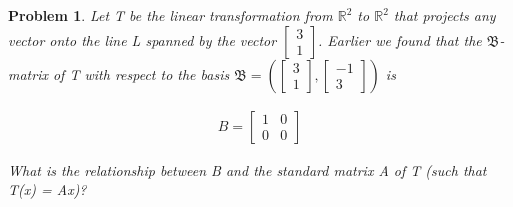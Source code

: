 \documentclass{article}
\newtheorem{problem}{Problem}
\begin{document}
\begin{problem}
Let T be the linear transformation from $\mathbb{R}^2$ to $\mathbb{R}^2$ that projects any vector onto the line L spanned by the vector $\begin{bmatrix} 3 \\ 1 \end{bmatrix}$. Earlier we found that the $\mathfrak{B}$-matrix of T with respect to the basis $\mathfrak{B} = \left( \begin{bmatrix} 3 \\ 1 \end{bmatrix}, \begin{bmatrix} -1 \\ 3 \end{bmatrix} \right)$ is

\begin{align*}
B = \begin{bmatrix} 1 & 0 \\ 0 & 0 \end{bmatrix}
\end{align*}

What is the relationship between B and the standard matrix A of T (such that T(x) = Ax)?
\end{problem}
\end{document}
